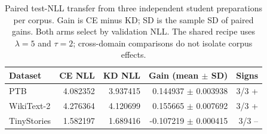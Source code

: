 \begin{table}[htbp]
\centering\small
\begin{tabular}{lrrrr}
\toprule
Dataset & CE NLL & KD NLL & Gain (mean $\pm$ SD) & Signs \\
\midrule
PTB & 4.082352 & 3.937415 & 0.144937 $\pm$ 0.003938 & 3/3 + \\
WikiText-2 & 4.276364 & 4.120699 & 0.155665 $\pm$ 0.007692 & 3/3 + \\
TinyStories & 1.582197 & 1.689416 & -0.107219 $\pm$ 0.000415 & 3/3 -- \\
\bottomrule
\end{tabular}
\caption{Paired test-NLL transfer from three independent student preparations per corpus. Gain is CE minus KD; SD is the sample SD of paired gains. Both arms select by validation NLL. The shared recipe uses $\lambda=5$ and $\tau=2$; cross-domain comparisons do not isolate corpus effects.}
\label{tab:cross_domain_transfer}
\end{table}
